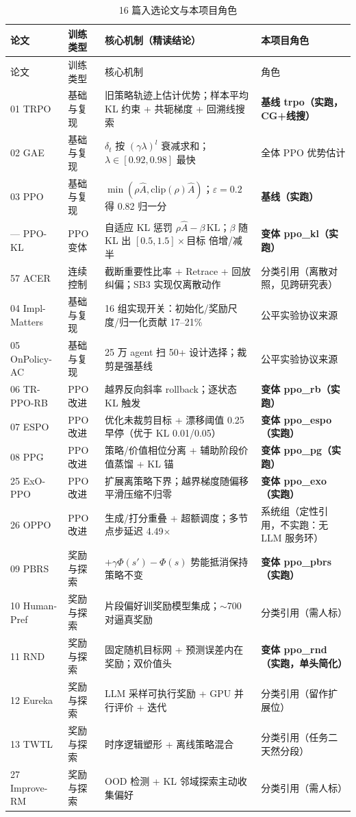 \begin{longtable}{p{3.2cm}p{2.2cm}p{7.2cm}p{2.6cm}}
\caption{16 篇入选论文与本项目角色}\\
\toprule
论文 & 训练类型 & 核心机制（精读结论） & 本项目角色 \\
\midrule
\endfirsthead
\toprule
论文 & 训练类型 & 核心机制 & 角色 \\
\midrule
\endhead
01 TRPO & 基础与复现 & 旧策略轨迹上估计优势；样本平均 KL 约束 + 共轭梯度 + 回溯线搜索 & \textbf{基线 trpo（实跑，CG+线搜）} \\
02 GAE & 基础与复现 & $\delta_t$ 按 $(\gamma\lambda)^l$ 衰减求和；$\lambda{\in}[0.92,0.98]$ 最快 & 全体 PPO 优势估计 \\
03 PPO & 基础与复现 & $\min(\rho\hat A,\mathrm{clip}(\rho)\hat A)$；$\varepsilon{=}0.2$ 得 0.82 归一分 & \textbf{基线（实跑）} \\
— PPO-KL & PPO 变体 & 自适应 KL 惩罚 $\rho\hat A-\beta\,\mathrm{KL}$；$\beta$ 随 KL 出 $[0.5,1.5]\times$目标 倍增/减半 & \textbf{变体 ppo\_kl（实跑）} \\
57 ACER & 连续控制 & 截断重要性比率 + Retrace + 回放纠偏；SB3 实现仅离散动作 & 分类引用（离散对照，见跨研究表） \\
04 Impl-Matters & 基础与复现 & 16 组实现开关：初始化/奖励尺度/归一化贡献 17--21\% & 公平实验协议来源 \\
05 OnPolicy-AC & 基础与复现 & 25 万 agent 扫 50+ 设计选择；裁剪是强基线 & 公平实验协议来源 \\
06 TR-PPO-RB & PPO 改进 & 越界反向斜率 rollback；逐状态 KL 触发 & \textbf{变体 ppo\_rb（实跑）} \\
07 ESPO & PPO 改进 & 优化未裁剪目标 + 漂移阈值 0.25 早停（优于 KL 0.01/0.05） & \textbf{变体 ppo\_espo（实跑）} \\
08 PPG & PPO 改进 & 策略/价值相位分离 + 辅助阶段价值蒸馏 + KL 锚 & \textbf{变体 ppo\_pg（实跑）} \\
25 ExO-PPO & PPO 改进 & 扩展离策略下界；越界梯度随偏移平滑压缩不归零 & \textbf{变体 ppo\_exo（实跑）} \\
26 OPPO & PPO 改进 & 生成/打分重叠 + 超额调度；多节点步延迟 4.49$\times$ & 系统组（定性引用，不实跑：无 LLM 服务环） \\
09 PBRS & 奖励与探索 & $+\gamma\Phi(s'){-}\Phi(s)$ 势能抵消保持策略不变 & \textbf{变体 ppo\_pbrs（实跑）} \\
10 Human-Pref & 奖励与探索 & 片段偏好训奖励模型集成；$\sim$700 对逼真奖励 & 分类引用（需人标） \\
11 RND & 奖励与探索 & 固定随机目标网 + 预测误差内在奖励；双价值头 & \textbf{变体 ppo\_rnd（实跑，单头简化）} \\
12 Eureka & 奖励与探索 & LLM 采样可执行奖励 + GPU 并行评价 + 迭代 & 分类引用（留作扩展位） \\
13 TWTL & 奖励与探索 & 时序逻辑塑形 + 离线策略混合 & 分类引用（任务二天然分段） \\
27 Improve-RM & 奖励与探索 & OOD 检测 + KL 邻域探索主动收集偏好 & 分类引用（需人标） \\
\bottomrule
\end{longtable}

